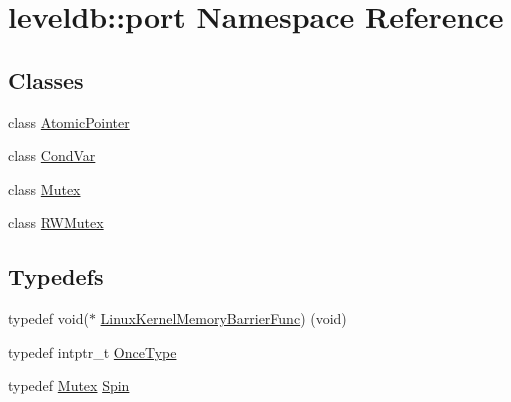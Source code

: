 \hypertarget{namespaceleveldb_1_1port}{}\section{leveldb\+:\+:port Namespace Reference}
\label{namespaceleveldb_1_1port}
\subsection*{Classes}
\begin{DoxyCompactItemize}
\item 
class \hyperlink{classleveldb_1_1port_1_1_atomic_pointer}{Atomic\+Pointer}
\item 
class \hyperlink{classleveldb_1_1port_1_1_cond_var}{Cond\+Var}
\item 
class \hyperlink{classleveldb_1_1port_1_1_mutex}{Mutex}
\item 
class \hyperlink{classleveldb_1_1port_1_1_r_w_mutex}{R\+W\+Mutex}
\end{DoxyCompactItemize}
\subsection*{Typedefs}
\begin{DoxyCompactItemize}
\item 
typedef void($\ast$ \hyperlink{namespaceleveldb_1_1port_a26aaa60a9935f76f68c0f6cd2cd842c3}{Linux\+Kernel\+Memory\+Barrier\+Func}) (void)
\item 
typedef intptr\+\_\+t \hyperlink{namespaceleveldb_1_1port_a80651a8fb458d9b7b3c1f492f9abd055}{Once\+Type}
\item 
typedef \hyperlink{classleveldb_1_1port_1_1_mutex}{Mutex} \hyperlink{namespaceleveldb_1_1port_a3017c82209c2da44f142ef633e012149}{Spin}
\end{DoxyCompactItemize}

